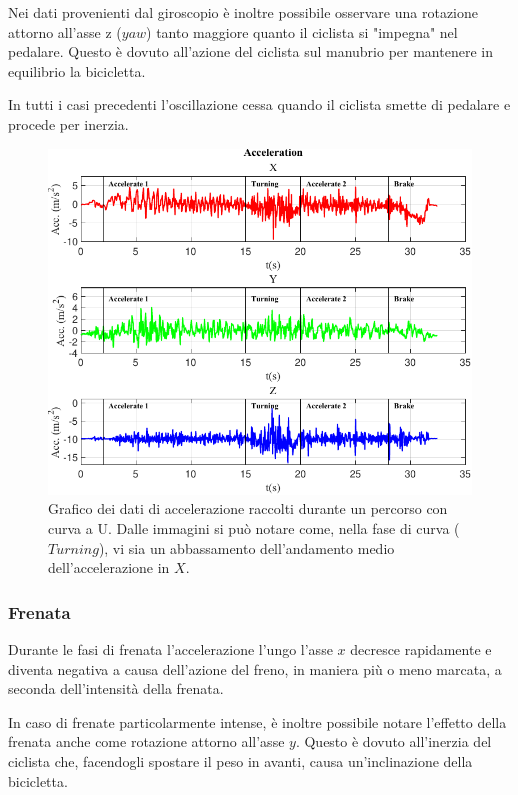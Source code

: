 \documentclass[class=article]{standalone}
\begin{document}
	Nei dati provenienti dal giroscopio è inoltre possibile osservare una rotazione attorno all'asse z (\(yaw\)) tanto maggiore quanto il ciclista si "impegna" nel pedalare. Questo è dovuto all'azione del ciclista sul manubrio per mantenere in equilibrio la bicicletta.
	
	In tutti i casi precedenti l'oscillazione cessa quando il ciclista smette di pedalare e procede per inerzia.
	
	\begin{center}
		\begin{figure}[h]
			\centering\includegraphics[width=.9\textwidth]{img/Acc CurvaUF.pdf}
			\caption[]{Grafico dei dati di accelerazione raccolti durante un percorso con curva a U. Dalle immagini si può notare come, nella fase di curva (\(Turning\)), vi sia un abbassamento dell'andamento medio dell'accelerazione in \(X\).}
			\label{fig:AccCurvaU}
		\end{figure}
	\end{center}
	
	\subsubsection{Frenata}
	Durante le fasi di frenata l'accelerazione l'ungo l'asse \(x\) decresce rapidamente e diventa negativa a causa dell'azione del freno, in maniera più o meno marcata, a seconda dell'intensità della frenata.
	
	In caso di frenate particolarmente intense, è inoltre possibile notare l'effetto della frenata anche come rotazione attorno all'asse \(y\). Questo è dovuto all'inerzia del ciclista che, facendogli spostare il peso in avanti, causa un'inclinazione della bicicletta.
	
\end{document}
